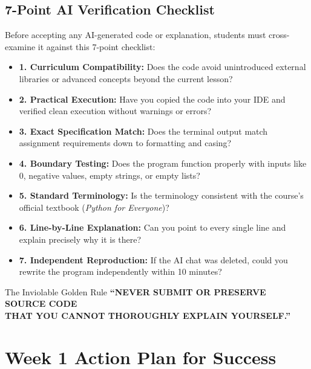 \documentclass[11pt,a4paper]{article}
\begin{document}
\subsection{7-Point AI Verification Checklist}
Before accepting any AI-generated code or explanation, students must cross-examine it against this 7-point checklist:
\begin{itemize}[leftmargin=1.5em, itemsep=2pt]
    \item[$\square$] \textbf{1. Curriculum Compatibility:} Does the code avoid unintroduced external libraries or advanced concepts beyond the current lesson?
    \item[$\square$] \textbf{2. Practical Execution:} Have you copied the code into your IDE and verified clean execution without warnings or errors?
    \item[$\square$] \textbf{3. Exact Specification Match:} Does the terminal output match assignment requirements down to formatting and casing?
    \item[$\square$] \textbf{4. Boundary Testing:} Does the program function properly with inputs like 0, negative values, empty strings, or empty lists?
    \item[$\square$] \textbf{5. Standard Terminology:} Is the terminology consistent with the course's official textbook (\textit{Python for Everyone})?
    \item[$\square$] \textbf{6. Line-by-Line Explanation:} Can you point to every single line and explain precisely why it is there?
    \item[$\square$] \textbf{7. Independent Reproduction:} If the AI chat was deleted, could you rewrite the program independently within 10 minutes?
\end{itemize}

\vspace{3mm}

\begin{warningbox}{The Inviolable Golden Rule}
\centering
\Large\textbf{``NEVER SUBMIT OR PRESERVE SOURCE CODE\\[2mm]THAT YOU CANNOT THOROUGHLY EXPLAIN YOURSELF.''}
\end{warningbox}

\vspace{4mm}
\section{Week 1 Action Plan for Success}
\end{document}

